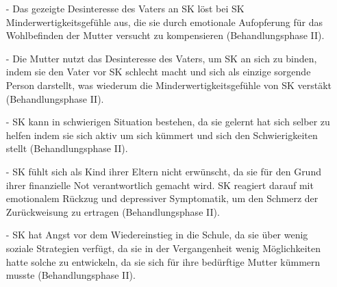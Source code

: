 \begin{itemize}
 \item [-] Das gezeigte Desinteresse des Vaters an SK löst bei SK Minderwertigkeitsgefühle aus, die sie durch emotionale Aufopferung für das Wohlbefinden der Mutter versucht zu kompensieren (Behandlungsphase II).
 \item [-] Die Mutter nutzt das Desinteresse des Vaters, um SK an sich zu binden, indem sie den Vater vor SK schlecht macht und sich als einzige sorgende Person darstellt, was wiederum die Minderwertigkeitsgefühle von SK verstäkt (Behandlungsphase II).
 \item [-] SK kann in schwierigen Situation bestehen, da sie gelernt hat sich selber zu helfen indem sie sich aktiv um sich kümmert und sich den Schwierigkeiten stellt (Behandlungsphase II).
 \item [-] SK fühlt sich als Kind ihrer Eltern nicht erwünscht, da sie für den Grund ihrer finanzielle Not verantwortlich gemacht wird. SK reagiert darauf mit emotionalem Rückzug und depressiver Symptomatik, um den Schmerz der Zurückweisung zu ertragen (Behandlungsphase II).
 \item [-] SK hat Angst vor dem Wiedereinstieg in die Schule, da sie über wenig soziale Strategien verfügt, da sie in der Vergangenheit wenig Möglichkeiten hatte solche zu entwickeln, da sie sich für ihre bedürftige Mutter kümmern musste (Behandlungsphase II).
\end{itemize}

